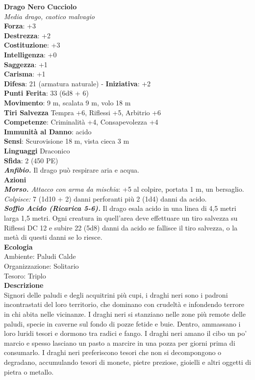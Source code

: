 \begin{multicols}{2}
\medskip\textbf{Drago Nero Cucciolo}\\
\emph{Media drago, caotico malvagio}\\
\textbf{Forza}: +3\\
\textbf{Destrezza}: +2\\
\textbf{Costituzione}: +3\\
\textbf{Intelligenza}: +0\\
\textbf{Saggezza}: +1\\
\textbf{Carisma}: +1\\
\textbf{Difesa}: 21 (armatura naturale) - \textbf{Iniziativa}: +2\\
\textbf{Punti Ferita}: 33 (6d8 + 6)\\
\textbf{Movimento}: 9 m, scalata 9 m, volo 18 m\\
\textbf{Tiri Salvezza} Tempra +6, Riflessi +5, Arbitrio +6\\
\textbf{Competenze}: Criminalità +4, Consapevolezza +4\\
\textbf{Immunità al Danno}: acido\\
\textbf{Sensi}: Scurovisione 18 m, vista cieca 3 m\\
\textbf{Linguaggi} Draconico\\
\textbf{Sfida}: 2 (450 PE)\smallskip\\
\emph{\textbf{Anfibio.}} Il drago può respirare aria e acqua.\\
\smallskip\textbf{Azioni}\\
\emph{\textbf{Morso.} Attacco con arma da mischia}: +5 al colpire, portata 1 m, un bersaglio.\\
\emph{Colpisce:} 7 (1d10 + 2) danni perforanti più 2 (1d4) danni da acido.\\
\emph{\textbf{Soffio Acido (Ricarica 5-6).}} Il drago esala acido in una linea di 4,5 metri larga 1,5 metri. Ogni creatura in quell'area deve effettuare un tiro salvezza su Riflessi DC  12 e subire 22 (5d8) danni da acido se fallisce il tiro salvezza, o la metà di questi danni se lo riesce.\\
\textbf{Ecologia}\\
Ambiente: Paludi Calde\\
Organizzazione: Solitario\\
Tesoro: Triplo\\
\textbf{Descrizione}\\
Signori delle paludi e degli acquitrini più cupi, i draghi neri sono i padroni incontrastati del loro territorio, che dominano con crudeltà e infondendo terrore in chi abita nelle vicinanze. I draghi neri si stanziano nelle zone più remote delle paludi, specie in caverne sul fondo di pozze fetide e buie. Dentro, ammassano i loro luridi tesori e dormono tra radici e fango. I draghi neri amano il cibo un po’ marcio e spesso lasciano un pasto a marcire in una pozza per giorni prima di consumarlo. I draghi neri preferiscono tesori che non si decompongono o degradano, accumulando tesori di monete, pietre preziose, gioielli e altri oggetti di pietra o metallo.\\


\end{multicols}
